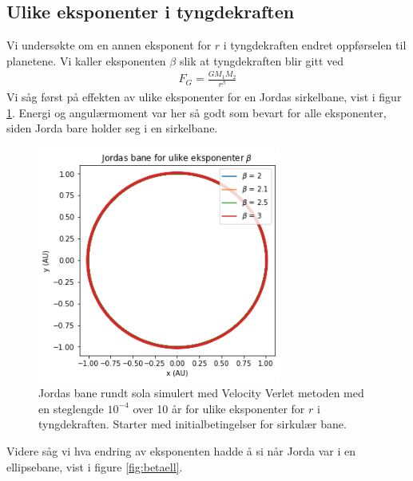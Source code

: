 \documentclass[reprint,english,notitlepage]{revtex4-1}
\begin{document}
\subsection{Ulike eksponenter i tyngdekraften}
	Vi undersøkte om en annen eksponent for $r$ i tyngdekraften endret oppførselen til planetene. Vi kaller eksponenten $\beta$ slik at tyngdekraften blir gitt ved
	\begin{equation}
	\begin{aligned}
	F_G = \frac{GM_1M_2}{r^\beta}
	\end{aligned}
	\end{equation}
	Vi såg først på effekten av ulike eksponenter for en Jordas sirkelbane, vist i figur \ref{fig:betacirc}. Energi og angulærmoment var her så godt som bevart for alle eksponenter, siden Jorda bare holder seg i en sirkelbane.

	\begin{figure}[H]
		\includegraphics[width=80mm]{../../Code/Figures/betacirc.png}
		\caption{Jordas bane rundt sola simulert med Velocity Verlet metoden med en steglengde $10^{-4}$ over 10 år for ulike eksponenter for $r$ i tyngdekraften. Starter med initialbetingelser for sirkulær bane.}
		\label{fig:betacirc}
	\end{figure}

	Videre såg vi hva endring av eksponenten hadde å si når Jorda var i en ellipsebane, vist i figure \ref{fig:betaell}.
\end{document}
